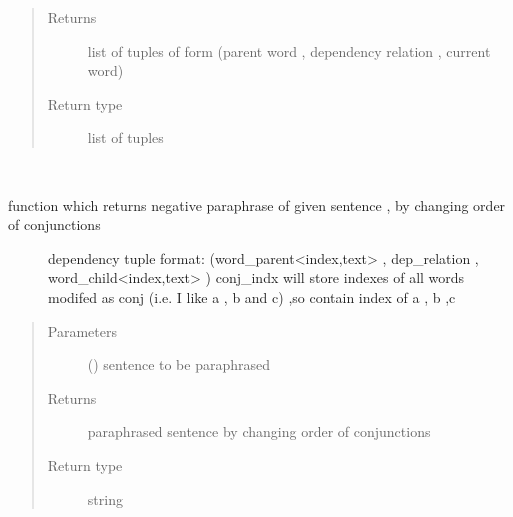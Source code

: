\documentclass[letterpaper,10pt,english]{sphinxmanual}
\begin{document}
\begin{fulllineitems}
\begin{fulllineitems}
\begin{quote}
\begin{description}
\item[{Returns}] \leavevmode
list of tuples of form (parent word , dependency relation , current word)

\item[{Return type}] \leavevmode
list of tuples

\end{description}\end{quote}

\end{fulllineitems}


\begin{fulllineitems}
\label{\detokenize{ParaphraseDatasetCreation.Hindi:ParaphraseDatasetCreation.Hindi.Positive.Positive_Paraphrases.get_paraphrase_by_change_conj}}~\begin{description}
\item[{function which returns negative paraphrase of given sentence , by changing order of conjunctions}] \leavevmode
dependency tuple format: (word\_parent\textless{}index,text\textgreater{} , dep\_relation , word\_child\textless{}index,text\textgreater{} )
conj\_indx will store indexes of all words modifed as conj (i.e. I like a , b and c) ,so contain index of a , b ,c

\end{description}
\begin{quote}\begin{description}
\item[{Parameters}] \leavevmode
{} () \textendash{} sentence to be paraphrased

\item[{Returns}] \leavevmode
paraphrased sentence by changing order of conjunctions

\item[{Return type}] \leavevmode
string

\end{description}\end{quote}

\end{fulllineitems}


\end{fulllineitems}
\end{document}

